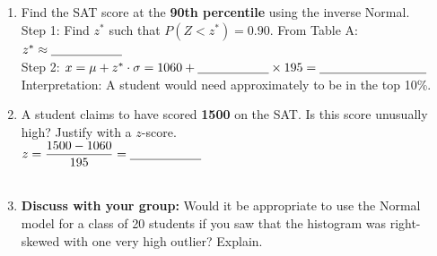 \documentclass[10pt]{article}
\begin{document}
\begin{enumerate}[leftmargin=1.5em, itemsep=8pt, resume]

  \item Find the SAT score at the \textbf{90th percentile} using the inverse Normal.\\[5pt]
        Step 1: Find $z^*$ such that $P(Z < z^*) = 0.90$. From Table A: $z^* \approx \blank{2cm}$\\[4pt]
        Step 2: $x = \mu + z^* \cdot \sigma = 1060 + \blank{2cm} \times 195 = \blank{3cm}$\\[4pt]
        Interpretation: A student would need approximately \blank{2cm} to be in the top 10\%.

  \item A student claims to have scored \textbf{1500} on the SAT.
        Is this score unusually high? Justify with a $z$-score.\\[5pt]
        $z = \dfrac{1500 - 1060}{195} = \blank{2cm}$\\[5pt]
        \writeline\\[1pt]\writeline

  \item \textbf{Discuss with your group:} Would it be appropriate to use the Normal model
        for a class of 20 students if you saw that the histogram was right-skewed with one
        very high outlier? Explain.\\[5pt]
        \writeline\\[1pt]\writeline

\end{enumerate}
\end{document}
